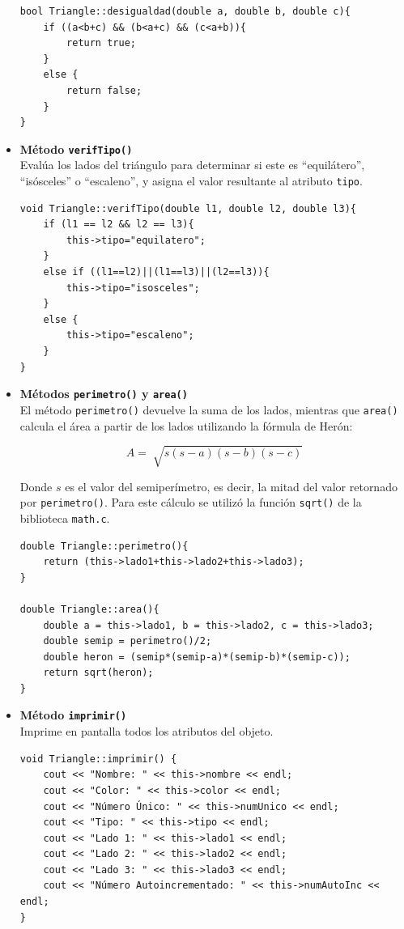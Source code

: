 \begin{itemize}
\begin{verbatim}
bool Triangle::desigualdad(double a, double b, double c){
	if ((a<b+c) && (b<a+c) && (c<a+b)){
		return true;
	}
	else {
		return false;
	}
}
\end{verbatim}

\item \textbf{Método \texttt{verifTipo()}}\\
Evalúa los lados del triángulo para determinar si este es ``equilátero'', ``isósceles'' o ``escaleno'', y asigna el valor resultante al atributo \texttt{tipo}.

\begin{verbatim}
void Triangle::verifTipo(double l1, double l2, double l3){
	if (l1 == l2 && l2 == l3){
		this->tipo="equilatero";
	}
	else if ((l1==l2)||(l1==l3)||(l2==l3)){
		this->tipo="isosceles";
	}
	else {
		this->tipo="escaleno";
	}
}
\end{verbatim}

\item \textbf{Métodos \texttt{perimetro()} y \texttt{area()}}\\
El método \texttt{perimetro()} devuelve la suma de los lados, mientras que \texttt{area()} calcula el área a partir de los lados utilizando la fórmula de Herón:

\begin{equation}
A = \sqrt[]{s(s-a)(s-b)(s-c)}
\end{equation}

Donde $s$ es el valor del semiperímetro, es decir, la mitad del valor retornado por \texttt{perimetro()}. Para este cálculo se utilizó la función \texttt{sqrt()} de la biblioteca \texttt{math.c}. 

\begin{verbatim}
double Triangle::perimetro(){
	return (this->lado1+this->lado2+this->lado3);
}

double Triangle::area(){
	double a = this->lado1, b = this->lado2, c = this->lado3;
	double semip = perimetro()/2;
	double heron = (semip*(semip-a)*(semip-b)*(semip-c));
	return sqrt(heron);
}
\end{verbatim}

\item \textbf{Método \texttt{imprimir()}}\\
Imprime en pantalla todos los atributos del objeto.

\begin{verbatim}
void Triangle::imprimir() {
	cout << "Nombre: " << this->nombre << endl;
	cout << "Color: " << this->color << endl;
	cout << "Número Único: " << this->numUnico << endl;
	cout << "Tipo: " << this->tipo << endl;
	cout << "Lado 1: " << this->lado1 << endl;
	cout << "Lado 2: " << this->lado2 << endl;
	cout << "Lado 3: " << this->lado3 << endl;
	cout << "Número Autoincrementado: " << this->numAutoInc << endl;
}
\end{verbatim}


\end{itemize}
